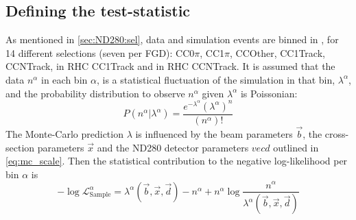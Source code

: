 \subsection{Defining the test-statistic}
As mentioned in \autoref{sec:ND280:sel}, data and simulation events are binned in \pmu, \cosmu for 14 different selections (seven per FGD): \numu CC0$\pi$, \numu CC1$\pi$, \numu CCOther, \numubar CC1Track, \numubar CCNTrack, \numu in RHC CC1Track and \numu in RHC CCNTrack. It is assumed that the data $n^{\alpha}$ in each bin $\alpha$, is a statistical fluctuation of the simulation in that bin, $\lambda^{\alpha}$, and the probability distribution to observe $n^{\alpha}$ given $\lambda^\alpha$ is Poissonian:
\begin{equation}
P(n^\alpha|\lambda^\alpha) = \frac{e^{-\lambda^\alpha} \left(\lambda^\alpha\right)^n}{\left(n^\alpha\right)!}
\end{equation}
The Monte-Carlo prediction $\lambda$ is influenced by the beam parameters $\vec{b}$, the cross-section parameters $\vec{x}$ and the ND280 detector parameters $vec{d}$ outlined in \autoref{eq:mc_scale}. Then the statistical contribution to the negative log-likelihood per \pmu \cosmu bin $\alpha$ is
\begin{equation}
-\log\mathcal{L}^\alpha_\text{Sample} = \lambda^\alpha(\vec{b},\vec{x},\vec{d}) - n^\alpha + n^\alpha\log\frac{n^\alpha}{\lambda^\alpha(\vec{b},\vec{x},\vec{d})}
\end{equation}

